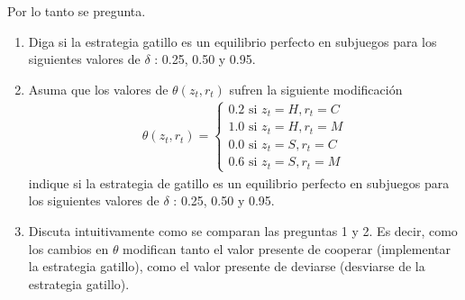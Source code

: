 \documentclass[11pt]{article}
\begin{document}
Por lo tanto se pregunta.
\begin{enumerate}
	\item Diga si la estrategia gatillo es un equilibrio perfecto en subjuegos para los siguientes valores de $\delta$ : 0.25, 0.50 y 0.95.
	\item Asuma que los valores de $\theta(z_{t},r_{t})$ sufren la siguiente modificaci\'on
	\begin{align*}
		\theta(z_{t},r_{t}) = \begin{cases}
		0.2 \text{ si } z_{t} = H, r_{t} = C \\
		1.0 \text{ si } z_{t} = H, r_{t} = M \\
		0.0 \text{ si } z_{t} = S, r_{t} = C \\
		0.6 \text{ si } z_{t} = S, r_{t} = M 
	\end{cases}
	\end{align*} indique si la estrategia de gatillo es un equilibrio perfecto en subjuegos para los siguientes valores de $\delta$ : 0.25, 0.50 y 0.95.
	\item Discuta intuitivamente como se comparan las preguntas 1 y 2. Es decir, como los cambios en $\theta$ modifican tanto el valor presente de cooperar (implementar la estrategia gatillo), como el valor presente de deviarse (desviarse de la estrategia gatillo).
\end{enumerate}



\end{document}
